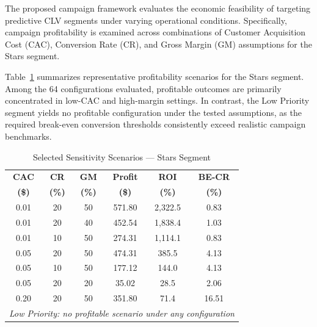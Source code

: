 \documentclass[conference]{IEEEtran}
\begin{document}
The proposed campaign framework evaluates the economic
feasibility of targeting predictive CLV segments under
varying operational conditions. Specifically, campaign
profitability is examined across combinations of Customer
Acquisition Cost (CAC), Conversion Rate (CR), and Gross
Margin (GM) assumptions for the Stars segment.

Table~\ref{tab:sensitivity_stars} summarizes representative
profitability scenarios for the Stars segment. Among the
64 configurations evaluated, profitable outcomes are
primarily concentrated in low-CAC and high-margin settings.
In contrast, the Low Priority segment yields no profitable
configuration under the tested assumptions, as the required
break-even conversion thresholds consistently exceed
realistic campaign benchmarks.

\begin{table}[H]
\centering
\caption{Selected Sensitivity Scenarios --- Stars Segment}
\label{tab:sensitivity_stars}

\renewcommand{\arraystretch}{1.2}
\setlength{\tabcolsep}{4pt}
\footnotesize

\begin{tabular}{| c c c c c c |}
\toprule

\textbf{CAC} & \textbf{CR} & \textbf{GM}
& \textbf{Profit} & \textbf{ROI}
& \textbf{BE-CR} \\

\textbf{(\$)} & \textbf{(\%)} & \textbf{(\%)}
& \textbf{(\$)} & \textbf{(\%)}
& \textbf{(\%)} \\

\midrule

0.01 & 20 & 50 & 571.80 & 2{,}322.5 & 0.83 \\
0.01 & 20 & 40 & 452.54 & 1{,}838.4 & 1.03 \\
0.01 & 10 & 50 & 274.31 & 1{,}114.1 & 0.83 \\
0.05 & 20 & 50 & 474.31 & 385.5 & 4.13 \\
0.05 & 10 & 50 & 177.12 & 144.0 & 4.13 \\
0.05 & 20 & 20 & 35.02 & 28.5 & 2.06 \\
0.20 & 20 & 50 & 351.80 & 71.4 & 16.51 \\

\midrule

\multicolumn{6}{|l|}{\textit{Low Priority: no profitable 
scenario under any configuration}} \\

\bottomrule
\end{tabular}

\end{table}
\end{document}
